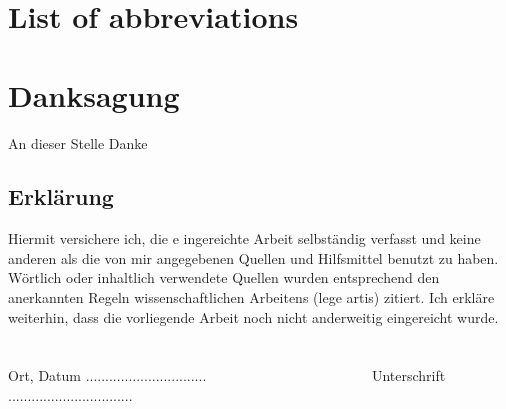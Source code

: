 \documentclass[a4paper,12pt,bibtotocnumbered, twosite]{scrreprt}
\begin{document}
\newpage

\tableofcontents
\chapter*{List of abbreviations}
\begin{acronym}[DARAM]

  
\end{acronym}
\cleardoublepage{}




\newpage  

\newpage

\newpage

\newpage

\newpage

\listoffigures
\listoftables







\chapter*{Danksagung}

An dieser Stelle Danke 
\newpage
\section*{Erklärung}
Hiermit versichere ich, die e
ingereichte Arbeit selbständig verfasst und
keine anderen als die von mir angegebenen Quellen und Hilfsmittel benutzt zu
haben. Wörtlich oder inhaltlich verwendete Quellen wurden entsprechend den
anerkannten Regeln wissenschaftlichen Arbeitens (lege artis) zitiert. Ich erkläre
weiterhin, dass die vorliegende Arbeit noch nicht anderweitig
eingereicht wurde. 
\\
\\
\\
Ort, Datum ............................... \ \ \ \ \ \ \ \ \ \ \ \ \ \ \ \ \ \ \ \ \ \ \ 
Unterschrift ................................
 
\end{document}
